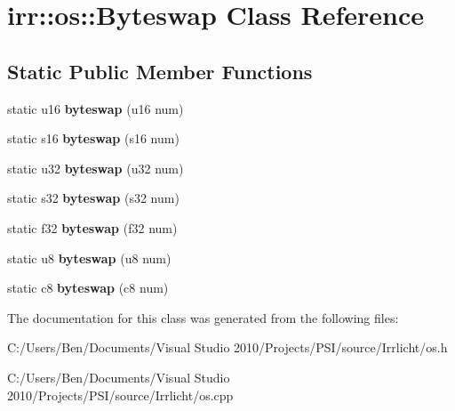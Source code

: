 \hypertarget{classirr_1_1os_1_1_byteswap}{\section{irr\-:\-:os\-:\-:Byteswap Class Reference}
\label{classirr_1_1os_1_1_byteswap}
}
\subsection*{Static Public Member Functions}
\begin{DoxyCompactItemize}
\item 
\hypertarget{classirr_1_1os_1_1_byteswap_a8e90502609b6b202a1d8124f5affe3bc}{static u16 {\bfseries byteswap} (u16 num)}\label{classirr_1_1os_1_1_byteswap_a8e90502609b6b202a1d8124f5affe3bc}

\item 
\hypertarget{classirr_1_1os_1_1_byteswap_a04710fc9b30011be943e57eaa5674e11}{static s16 {\bfseries byteswap} (s16 num)}\label{classirr_1_1os_1_1_byteswap_a04710fc9b30011be943e57eaa5674e11}

\item 
\hypertarget{classirr_1_1os_1_1_byteswap_a8488985634866c25bf3f30f2867dbd8e}{static u32 {\bfseries byteswap} (u32 num)}\label{classirr_1_1os_1_1_byteswap_a8488985634866c25bf3f30f2867dbd8e}

\item 
\hypertarget{classirr_1_1os_1_1_byteswap_a0a96c0c51b05cf4aee02369035beca0a}{static s32 {\bfseries byteswap} (s32 num)}\label{classirr_1_1os_1_1_byteswap_a0a96c0c51b05cf4aee02369035beca0a}

\item 
\hypertarget{classirr_1_1os_1_1_byteswap_a25df0abec8d5dad1e9c4104d8d40ca81}{static f32 {\bfseries byteswap} (f32 num)}\label{classirr_1_1os_1_1_byteswap_a25df0abec8d5dad1e9c4104d8d40ca81}

\item 
\hypertarget{classirr_1_1os_1_1_byteswap_abe3716deb7c75f82faf019703c154fda}{static u8 {\bfseries byteswap} (u8 num)}\label{classirr_1_1os_1_1_byteswap_abe3716deb7c75f82faf019703c154fda}

\item 
\hypertarget{classirr_1_1os_1_1_byteswap_a9f023e6e4fedd97dde7324d6d55b5f20}{static c8 {\bfseries byteswap} (c8 num)}\label{classirr_1_1os_1_1_byteswap_a9f023e6e4fedd97dde7324d6d55b5f20}

\end{DoxyCompactItemize}


The documentation for this class was generated from the following files\-:\begin{DoxyCompactItemize}
\item 
C\-:/\-Users/\-Ben/\-Documents/\-Visual Studio 2010/\-Projects/\-P\-S\-I/source/\-Irrlicht/os.\-h\item 
C\-:/\-Users/\-Ben/\-Documents/\-Visual Studio 2010/\-Projects/\-P\-S\-I/source/\-Irrlicht/os.\-cpp\end{DoxyCompactItemize}

